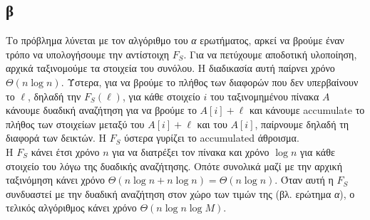 \documentclass[12pt,a4paper]{article}
\begin{document}
  \subsection{β}
    Το πρόβλημα λύνεται με τον αλγόριθμο του \textit{α} ερωτήματος, αρκεί να
    βρούμε έναν τρόπο να υπολογήσουμε την αντίστοιχη \( F_S \). Για να πετύχουμε
    αποδοτική υλοποίηση, αρχικά ταξινομούμε τα στοιχεία του συνόλου. Η διαδικασία
    αυτή παίρνει χρόνο \( \Theta(n\log{n}) \). Ύστερα, για να βρούμε το πλήθος
    των διαφορών που δεν υπερβαίνουν το \( \ell \), δηλαδή την \( F_S(\ell) \),
    για κάθε στοιχείο \( i \) του ταξινομημένου πίνακα \( A\) κάνουμε δυαδική αναζήτηση για να βρούμε
    το \( A[i] + \ell \) και κάνουμε {\latintext accumulate} το πλήθος των στοιχείων
    μεταξύ του \( Α[i] + \ell \) και του \( A[i] \), παίρνουμε δηλαδή τη διαφορά
    των δεικτών. Η \( F_S \) ύστερα γυρίζει το {\latintext accumulated} άθροισμα.\\
    Η \( F_S \) κάνει έτσι χρόνο \( n \) για να διατρέξει τον πίνακα και 
    χρόνο \( \log{n} \) για κάθε στοιχείο του λόγω της δυαδικής αναζήτησης.
    Οπότε συνολικά μαζί με την αρχική ταξινόμηση κάνει χρόνο \( \Theta(n\log{n}
    + n\log{n})=\Theta(n\log{n}) \).
    Όταν αυτή η \( F_S \) συνδυαστεί με την δυαδική αναζήτηση στον χώρο των τιμών
    της (βλ. ερώτημα \textit{α}), ο τελικός αλγόριθμος κάνει χρόνο \( \Theta
    (n\log{n}\log{M}) \).
\end{document}
